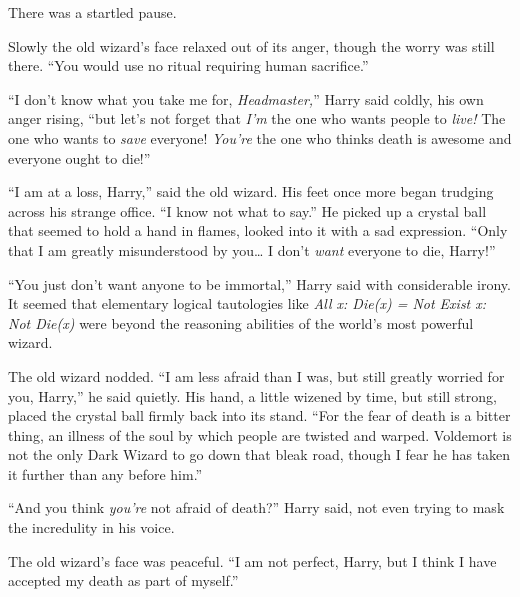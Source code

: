 There was a startled pause.

Slowly the old wizard's face relaxed out of its anger, though the worry
was still there. ``You would use no ritual requiring human sacrifice.''

``I don't know what you take me for, \emph{Headmaster,}'' Harry said
coldly, his own anger rising, ``but let's not forget that \emph{I'm} the
one who wants people to \emph{live!} The one who wants to \emph{save}
everyone! \emph{You're} the one who thinks death is awesome and everyone
ought to die!''

``I am at a loss, Harry,'' said the old wizard. His feet once more began
trudging across his strange office. ``I know not what to say.'' He
picked up a crystal ball that seemed to hold a hand in flames, looked
into it with a sad expression. ``Only that I am greatly misunderstood by
you\ldots{} I don't \emph{want} everyone to die, Harry!''

``You just don't want anyone to be immortal,'' Harry said with
considerable irony. It seemed that elementary logical tautologies like
\emph{All x: Die(x) = Not Exist x: Not Die(x)} were beyond the reasoning
abilities of the world's most powerful wizard.

The old wizard nodded. ``I am less afraid than I was, but still greatly
worried for you, Harry,'' he said quietly. His hand, a little wizened by
time, but still strong, placed the crystal ball firmly back into its
stand. ``For the fear of death is a bitter thing, an illness of the soul
by which people are twisted and warped. Voldemort is not the only Dark
Wizard to go down that bleak road, though I fear he has taken it further
than any before him.''

``And you think \emph{you're} not afraid of death?'' Harry said, not
even trying to mask the incredulity in his voice.

The old wizard's face was peaceful. ``I am not perfect, Harry, but I
think I have accepted my death as part of myself.''

